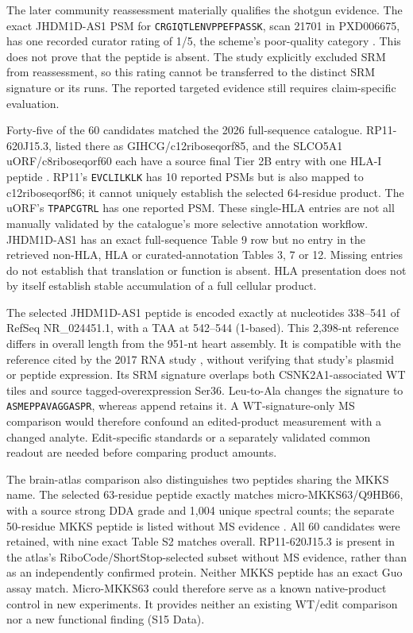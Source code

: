 \documentclass[11pt,a4paper]{article}
\begin{document}
The later community reassessment materially qualifies the shotgun evidence.
The exact JHDM1D-AS1 PSM for \texttt{CRGIQTLENVPPEFPASSK}, scan 21701
in PXD006675, has one recorded curator rating of 1/5, the scheme's
poor-quality category \cite{wacholder}. This does not prove that the peptide
is absent. The study explicitly excluded SRM from reassessment, so this
rating cannot be transferred to the distinct SRM signature or its runs.
The reported targeted evidence still requires claim-specific evaluation.

Forty-five of the 60 candidates matched the 2026 full-sequence catalogue.
RP11-620J15.3, listed there as GIHCG/c12riboseqorf85, and the SLCO5A1
uORF/c8riboseqorf60 each have a source final Tier 2B entry with one
HLA-I peptide \cite{deutsch}. RP11's \texttt{EVCLILKLK} has 10 reported
PSMs but is also mapped to c12riboseqorf86; it cannot uniquely establish
the selected 64-residue product. The uORF's \texttt{TPAPCGTRL} has one
reported PSM. These single-HLA entries are not all manually validated by
the catalogue's more selective annotation workflow. JHDM1D-AS1 has an
exact full-sequence Table 9 row but no entry in the retrieved non-HLA,
HLA or curated-annotation Tables 3, 7 or 12. Missing entries do not establish that translation or function is absent. HLA presentation does not by
itself establish stable accumulation of a full cellular product.

The selected JHDM1D-AS1 peptide is encoded exactly at nucleotides 338--541
of RefSeq NR\_024451.1, with a TAA at 542--544 (1-based). This 2,398-nt
reference differs in overall length from the 951-nt heart assembly.
It is compatible with the reference cited by the 2017 RNA study
\cite{kondo}, without verifying that study's plasmid or peptide expression.
Its SRM signature overlaps both CSNK2A1-associated WT tiles and source
tagged-overexpression Ser36. Leu-to-Ala changes the signature to
\texttt{ASMEPPAVAGGASPR}, whereas append retains it. A WT-signature-only
MS comparison would therefore confound an edited-product measurement
with a changed analyte. Edit-specific standards or a separately validated
common readout are needed before comparing product amounts.

The brain-atlas comparison also distinguishes two peptides sharing the MKKS
name. The selected 63-residue peptide exactly matches micro-MKKS63/Q9HB66,
with a source strong DDA grade and 1,004 unique spectral counts; the separate
50-residue MKKS peptide is listed without MS evidence \cite{brain}.
All 60 candidates were retained, with nine exact Table S2 matches overall.
RP11-620J15.3 is present in the atlas's RiboCode/ShortStop-selected subset
without MS evidence, rather than as an independently confirmed protein.
Neither MKKS peptide has an exact Guo assay match. Micro-MKKS63 could therefore serve as a known native-product control in new experiments. It provides neither an existing WT/edit comparison nor a new functional finding (S15 Data).
\end{document}

